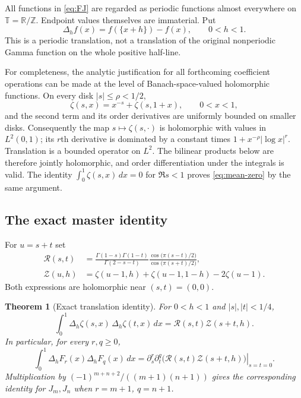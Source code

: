 \documentclass[11pt,a4paper]{article}
\numberwithin{equation}{section}
\newtheorem{theorem}{Theorem}[section]
\theoremstyle{definition}
\theoremstyle{remark}
\begin{document}
All functions in \eqref{eq:FJ} are regarded as periodic functions almost
everywhere on $\mathbb T=\mathbb R/\mathbb Z$. Endpoint values themselves
are immaterial. Put
\[
 \Delta_hf(x)=f(\{x+h\})-f(x),\qquad 0<h<1.
\]
This is a periodic translation, not a translation of the original
nonperiodic Gamma function on the whole positive half-line.

For completeness, the analytic justification for all forthcoming
coefficient operations can be made at the level of Banach-space-valued
holomorphic functions. On every disk $|s|\leq\rho<1/2$,
\[
 \zeta(s,x)=x^{-s}+\zeta(s,1+x),\qquad 0<x<1,
\]
and the second term and its order derivatives are uniformly bounded on
smaller disks. Consequently the map $s\mapsto\zeta(s,\cdot)$ is
holomorphic with values in $L^2(0,1)$; its $r$th derivative is dominated
by a constant times $1+x^{-\rho}|\log x|^r$. Translation is a bounded
operator on $L^2$. The bilinear products below are therefore jointly
holomorphic, and order differentiation under the integrals is valid.
The identity $\int_0^1\zeta(s,x)\,dx=0$ for $\Re s<1$ proves
\eqref{eq:mean-zero} by the same argument.

\subsection{The exact master identity}

For $u=s+t$ set
\begin{align}
 \mathcal R(s,t)&=
 \frac{\Gamma(1-s)\Gamma(1-t)}{\Gamma(2-s-t)}
 \frac{\cos\bigl(\pi(s-t)/2\bigr)}{\cos\bigl(\pi(s+t)/2\bigr)},
 \label{eq:R-kernel}\\
 \mathcal Z(u,h)&=\zeta(u-1,h)+\zeta(u-1,1-h)-2\zeta(u-1).
 \label{eq:Z-kernel}
\end{align}
Both expressions are holomorphic near $(s,t)=(0,0)$.

\begin{theorem}[Exact translation identity]\label{thm:translation}
For $0<h<1$ and $|s|,|t|<1/4$,
\begin{equation}\label{eq:translation-master}
 \boxed{\quad
 \int_0^1\Delta_h\zeta(s,x)\,\Delta_h\zeta(t,x)\,dx
      =\mathcal R(s,t)\mathcal Z(s+t,h).
 \quad}
\end{equation}
In particular, for every $r,q\geq0$,
\begin{equation}\label{eq:translation-jets}
 \int_0^1\Delta_hF_r(x)\Delta_hF_q(x)\,dx
 =\left.\partial_s^r\partial_t^q
        \bigl(\mathcal R(s,t)\mathcal Z(s+t,h)\bigr)\right|_{s=t=0}.
\end{equation}
Multiplication by $(-1)^{m+n+2}/((m+1)(n+1))$ gives the corresponding
identity for $J_m,J_n$ when $r=m+1$, $q=n+1$.
\end{theorem}
\end{document}
